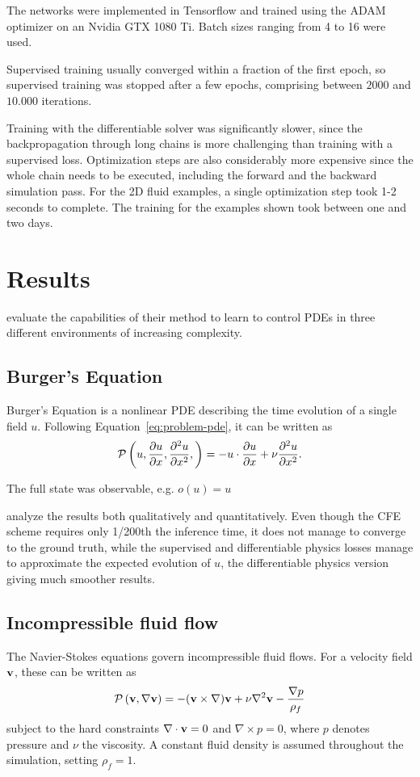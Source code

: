 \documentclass[acmtog]{techreportacmart}
\begin{document}
The networks were implemented in Tensorflow \cite{tensorflow} and trained using
the ADAM optimizer on an Nvidia GTX 1080 Ti. Batch sizes ranging from 4 to 16
were used.

Supervised training usually converged within a fraction of the first epoch, so
supervised training was stopped after a few epochs, comprising between $2000$
and $10.000$ iterations.

Training with the differentiable solver was significantly slower, since the
backpropagation through long chains is more challenging than training with
a supervised loss. Optimization steps are also considerably more expensive since
the whole chain needs to be executed, including the forward and the backward
simulation pass. For the 2D fluid examples, a single optimization step took 1-2
seconds to complete. The training for the examples shown took between one and
two days. 

\section{Results}
\cite{ControlPDEs} evaluate the capabilities of their method to learn to control
PDEs in three different environments of increasing complexity.
\subsection{Burger's Equation}
Burger's Equation is a nonlinear PDE describing the time evolution of a single
field $u$. Following Equation~\eqref{eq:problem-pde}, it can be written as
\begin{equation}
  \mathcal{P} \left( 
    u, \pdv{u}{x}, \pdv[2]{u}{x},
  \right) = 
  -u \cdot \pdv{u}{x} + \nu \pdv[2]{u}{x}.
\end{equation}

The full state was observable, e.g. $o(u) = u$

\cite{ControlPDEs} analyze the results both qualitatively and quantitatively.
Even though the CFE scheme requires only 1/200th the inference time, it does not
manage to converge to the ground truth, while the supervised and differentiable
physics losses manage to approximate the expected evolution of $u$, the
differentiable physics version giving much smoother results. 

\subsection{Incompressible fluid flow}
The Navier-Stokes equations govern incompressible fluid flows. For a velocity
field $\vb{v}$, these can be written as
\begin{equation}
    \mathcal{P} \left( 
      \vb{v}, \nabla \vb{v}
    \right) = 
    -(\vb{v}\times \nabla)\vb{v} + \nu \nabla^2\vb{v} - \frac{\nabla p}{\rho_f}
\end{equation}
subject to the hard constraints $\nabla \cdot \vb{v}= 0$ and  $\nabla \times p = 0$,
where $p$ denotes pressure and $\nu$ the viscosity. A constant fluid density is
assumed throughout the simulation, setting $\rho_f = 1$.
\end{document}
